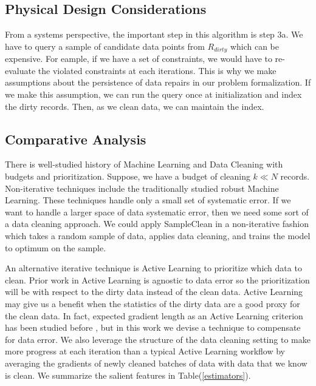 \subsection{Physical Design Considerations}
From a systems perspective, the important step in this algorithm is step 3a.
We have to query a sample of candidate data points from $R_{dirty}$ which 
can be expensive.
For eample, if we have a set of constraints, we would have to re-evaluate 
the violated constraints at each iterations.
This is why we make assumptions about the persistence of data repairs in our
problem formalization.
If we make this assumption, we can run the query once at initialization and index 
the dirty records.
Then, as we clean data, we can maintain the index.

\subsection{Comparative Analysis}
There is well-studied history of Machine Learning and Data Cleaning with budgets and prioritization. 
Suppose, we have a budget of cleaning $k\ll N$ records.
Non-iterative techniques include the traditionally studied robust Machine Learning.
These techniques handle only a small set of systematic error.
If we want to handle a larger space of data systematic error, then we need some sort of a data cleaning approach.
We could apply SampleClean \cite{wang1999sample} in a non-iterative fashion which takes a random sample of data, applies data cleaning, and trains the model to optimum on the sample.

An alternative iterative technique is Active Learning to prioritize which data to clean.
Prior work in Active Learning is agnostic to data error so the prioritization will be with respect to the dirty data instead of the clean data.
Active Learning may give us a benefit when the statistics of the dirty data are a good proxy for the clean data.
In fact, expected gradient length as an Active Learning criterion has been studied before \cite{settles2010active}, but in this work we devise a technique to compensate for data error.
We also leverage the structure of the data cleaning setting to make more progress at each iteration than a typical Active Learning workflow by averaging the gradients of newly cleaned batches of data with data that we know is clean.
We summarize the salient features in Table(\ref{estimators}).


